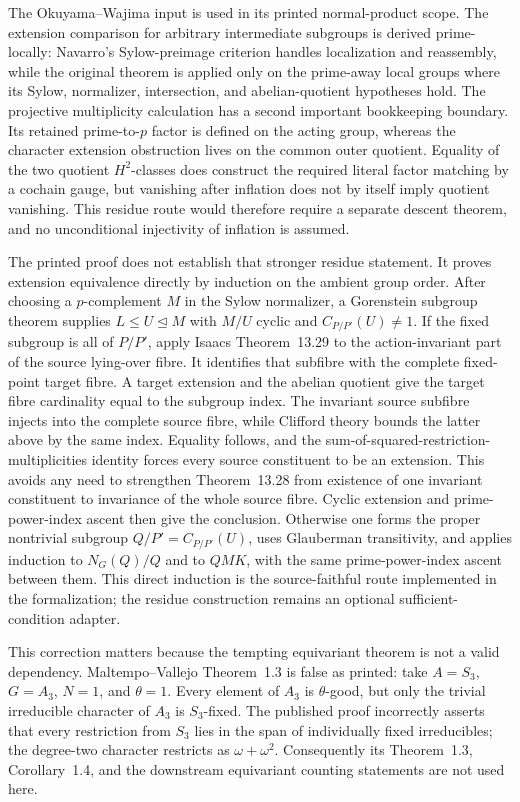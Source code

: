 \documentclass[11pt]{article}
\begin{document}
The Okuyama--Wajima input is used in its printed normal-product scope.
The extension comparison for arbitrary intermediate subgroups is derived
prime-locally: Navarro's Sylow-preimage criterion handles localization and
reassembly, while the original theorem is applied only on the
prime-away local groups where its Sylow, normalizer, intersection, and
abelian-quotient hypotheses hold.  The projective multiplicity
calculation has a second important bookkeeping boundary.  Its retained
prime-to-\(p\) factor is defined on the acting group, whereas the character
extension obstruction lives on the common outer quotient.  Equality of the
two quotient \(H^2\)-classes does construct the required literal factor
matching by a cochain gauge, but vanishing after inflation does not by
itself imply quotient vanishing.  This residue route would therefore
require a separate descent theorem, and no unconditional injectivity of
inflation is assumed.

The printed proof does not establish that stronger residue statement.
It proves extension equivalence directly by induction on the ambient group
order.  After choosing a \(p\)-complement \(M\) in the Sylow normalizer, a
Gorenstein subgroup theorem
\cite[Chapter~3, Theorem~2.2]{Gorenstein1968} supplies
\(L\leq U\trianglelefteq M\) with \(M/U\) cyclic and
\(C_{P/P'}(U)\neq1\).  If the fixed subgroup is all of \(P/P'\), apply
Isaacs Theorem~13.29
\cite[Theorem~13.29]{Isaacs1976} to the action-invariant part of the
source lying-over fibre.  It identifies that subfibre with the complete
fixed-point target fibre.  A target extension and the abelian quotient
give the target fibre cardinality equal to the subgroup index.  The
invariant source subfibre injects into the complete source fibre, while
Clifford theory bounds the latter above by the same index.  Equality
follows, and the sum-of-squared-restriction-multiplicities identity forces
every source constituent to be an extension.  This avoids any need to
strengthen Theorem~13.28 from existence of one invariant constituent to
invariance of the whole source fibre.  Cyclic extension and
prime-power-index ascent then give the conclusion.  Otherwise one forms the
proper nontrivial subgroup \(Q/P'=C_{P/P'}(U)\), uses Glauberman
transitivity, and applies induction to \(N_G(Q)/Q\) and to \(QMK\), with
the same prime-power-index ascent between them.  This direct induction is
the source-faithful route implemented in the formalization; the residue
construction remains an optional sufficient-condition adapter.

This correction matters because the tempting equivariant theorem is not a
valid dependency.  Maltempo--Vallejo Theorem~1.3
\cite{MaltempoVallejo2026} is false as printed: take
\(A=S_3\), \(G=A_3\), \(N=1\), and \(\theta=1\).  Every element of \(A_3\)
is \(\theta\)-good, but only the trivial irreducible character of \(A_3\)
is \(S_3\)-fixed.  The published proof incorrectly asserts that every
restriction from \(S_3\) lies in the span of individually fixed
irreducibles; the degree-two character restricts as
\(\omega+\omega^2\).  Consequently its Theorem~1.3, Corollary~1.4, and
the downstream equivariant counting statements are not used here.
\end{document}

